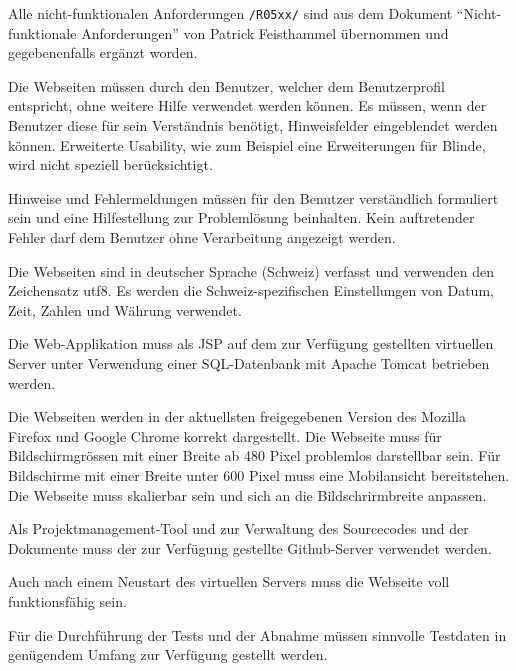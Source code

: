 Alle nicht-funktionalen Anforderungen \texttt{/R05xx/} sind aus dem Dokument "`Nicht-funktionale Anforderungen"' von Patrick Feisthammel \cite{patfeist15nifunanf} übernommen und gegebenenfalls ergänzt worden.

\setcounter{RequirementSubsectionCounter}{5}
Die Webseiten müssen durch den Benutzer, welcher dem Benutzerprofil entspricht, ohne weitere Hilfe verwendet werden können. Es müssen, wenn der Benutzer diese für sein Verständnis benötigt, Hinweisfelder eingeblendet werden können.
Erweiterte Usability, wie zum Beispiel eine Erweiterungen für Blinde, wird nicht speziell berücksichtigt.

Hinweise und Fehlermeldungen müssen für den Benutzer verständlich formuliert sein und eine Hilfestellung zur Problemlösung beinhalten. Kein auftretender Fehler darf dem Benutzer ohne Verarbeitung angezeigt werden.

Die Webseiten sind in deutscher Sprache (Schweiz) verfasst und verwenden den Zeichensatz \gls{utf8}. Es werden die Schweiz-spezifischen Einstellungen von Datum, Zeit, Zahlen und Währung verwendet.

Die Web-Applikation muss als \gls{JSP} auf dem zur Verfügung gestellten virtuellen Server unter Verwendung einer SQL-Datenbank mit Apache Tomcat betrieben werden.

Die Webseiten werden in der aktuellsten freigegebenen Version des Mozilla Firefox und Google Chrome korrekt dargestellt. Die Webseite muss für Bildschirmgrössen mit einer Breite ab 480 Pixel problemlos darstellbar sein. Für Bildschirme mit einer Breite unter 600 Pixel muss eine Mobilansicht bereitstehen. Die Webseite muss skalierbar sein und sich an die Bildschrirmbreite anpassen.

Als Projektmanagement-Tool und zur Verwaltung des Sourcecodes und der Dokumente muss der zur Verfügung gestellte Github-Server verwendet werden.

Auch nach einem Neustart des virtuellen Servers muss die Webseite voll funktionsfähig sein.

Für die Durchführung der Tests und der Abnahme müssen sinnvolle Testdaten in genügendem Umfang zur Verfügung gestellt werden.

